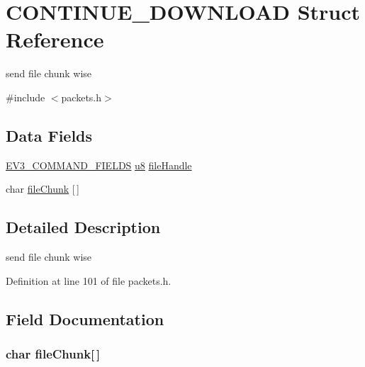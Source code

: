 \hypertarget{struct_c_o_n_t_i_n_u_e___d_o_w_n_l_o_a_d}{}\section{C\+O\+N\+T\+I\+N\+U\+E\+\_\+\+D\+O\+W\+N\+L\+O\+A\+D Struct Reference}
\label{struct_c_o_n_t_i_n_u_e___d_o_w_n_l_o_a_d}


send file chunk wise  




{\ttfamily \#include $<$packets.\+h$>$}

\subsection*{Data Fields}
\begin{DoxyCompactItemize}
\item 
\hyperlink{packets_8h_a0c26a010ef0da2962a751796943824c9}{E\+V3\+\_\+\+C\+O\+M\+M\+A\+N\+D\+\_\+\+F\+I\+E\+L\+D\+S} \hyperlink{defs_8h_a92c50087ca0e64fa93fc59402c55f8ca}{u8} \hyperlink{struct_c_o_n_t_i_n_u_e___d_o_w_n_l_o_a_d_a56fd3710165ab3fa738989d317905db6}{file\+Handle}
\item 
char \hyperlink{struct_c_o_n_t_i_n_u_e___d_o_w_n_l_o_a_d_a9ef66325882e0d08e44dc47e91bf8283}{file\+Chunk} \mbox{[}$\,$\mbox{]}
\end{DoxyCompactItemize}


\subsection{Detailed Description}
send file chunk wise 

Definition at line 101 of file packets.\+h.



\subsection{Field Documentation}
\hypertarget{struct_c_o_n_t_i_n_u_e___d_o_w_n_l_o_a_d_a9ef66325882e0d08e44dc47e91bf8283}{}
\subsubsection[{file\+Chunk}]{\setlength{\rightskip}{0pt plus 5cm}char file\+Chunk\mbox{[}$\,$\mbox{]}}\label{struct_c_o_n_t_i_n_u_e___d_o_w_n_l_o_a_d_a9ef66325882e0d08e44dc47e91bf8283}


